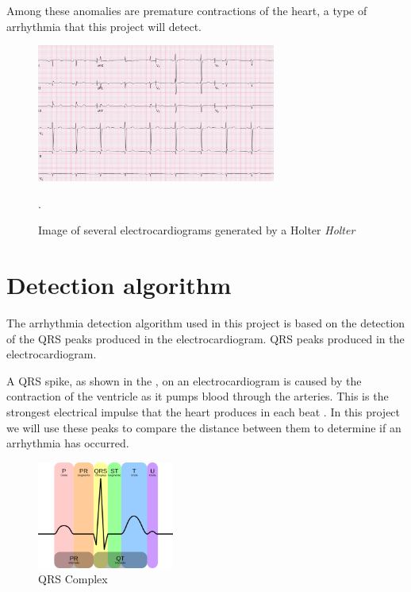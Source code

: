 Among these anomalies are premature contractions of the heart, a type of arrhythmia that this project will detect. 

\begin{figure}[h!]
	\centering
	\includegraphics[width=0.7\textwidth]{./Images/img_introduccion/electrocardiograma.png}
	\caption{Image of several electrocardiograms generated by a Holter \textit{Holter} \cite{fotoElectrocardiograma}}.
	\label{fig:electrocardiogramas}
\end{figure}

\section*{Detection algorithm}
The arrhythmia detection algorithm used in this project is based on the detection of the QRS peaks produced in the electrocardiogram. 
QRS peaks produced in the electrocardiogram.

A QRS spike, as shown in the , on an electrocardiogram is caused by the contraction of the ventricle as it pumps blood through the arteries. This is the strongest electrical impulse that the heart produces in each beat \cite{wiki:complejoQRS}. In this project we will use these peaks to compare the distance between them to determine if an arrhythmia has occurred. 

\begin{figure}[h]
	\centering
	\includegraphics[width=0.4\textwidth]{./Images/img_introduccion/complejoQRS.png}
	\caption[Complejo QRS]{QRS Complex \cite{desai2021low}}
	\label{fig:complejoQRS}
\end{figure}


